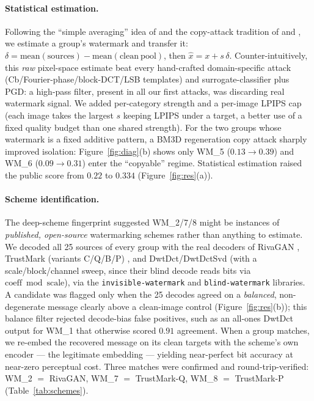 \documentclass{article}
\begin{document}
\paragraph{Statistical estimation.} Following the ``simple averaging'' idea of \citet{yang2024averaging} and the copy-attack tradition of \citet{kutter2000copy} and \citet{craver1998resolving}, we estimate a group's watermark and transfer it: $\delta = \mathrm{mean}(\mathrm{sources}) - \mathrm{mean}(\mathrm{clean\ pool})$, then $\hat{x}=x+s\,\delta$. Counter-intuitively, this \emph{raw} pixel-space estimate beat every hand-crafted domain-specific attack (Cb/Fourier-phase/block-DCT/LSB templates) and surrogate-classifier plus PGD: a high-pass filter, present in all our first attacks, was discarding real watermark signal. We added per-category strength and a per-image LPIPS cap (each image takes the largest $s$ keeping LPIPS under a target, a better use of a fixed quality budget than one shared strength). For the two groups whose watermark is a fixed additive pattern, a BM3D regeneration copy attack sharply improved isolation: Figure~\ref{fig:diag}(b) shows only WM\_5 ($0.13\!\to\!0.39$) and WM\_6 ($0.09\!\to\!0.31$) enter the ``copyable'' regime. Statistical estimation raised the public score from $0.22$ to $0.334$ (Figure~\ref{fig:res}(a)).

\paragraph{Scheme identification.} The deep-scheme fingerprint suggested WM\_2/7/8 might be instances of \emph{published, open-source} watermarking schemes rather than anything to estimate. We decoded all 25 sources of every group with the real decoders of RivaGAN \citep{zhang2019rivagan}, TrustMark (variants C/Q/B/P) \citep{bui2023trustmark}, and DwtDct/DwtDctSvd (with a scale/block/channel sweep, since their blind decode reads bits via $\mathrm{coeff}\bmod\mathrm{scale}$), via the \texttt{invisible-watermark} and \texttt{blind-watermark} libraries. A candidate was flagged only when the 25 decodes agreed on a \emph{balanced}, non-degenerate message clearly above a clean-image control (Figure~\ref{fig:res}(b)); this balance filter rejected decode-bias false positives, such as an all-ones DwtDct output for WM\_1 that otherwise scored $0.91$ agreement. When a group matches, we re-embed the recovered message on its clean targets with the scheme's own encoder --- the legitimate embedding --- yielding near-perfect bit accuracy at near-zero perceptual cost. Three matches were confirmed and round-trip-verified: WM\_2 $=$ RivaGAN, WM\_7 $=$ TrustMark-Q, WM\_8 $=$ TrustMark-P (Table~\ref{tab:schemes}).
\end{document}
